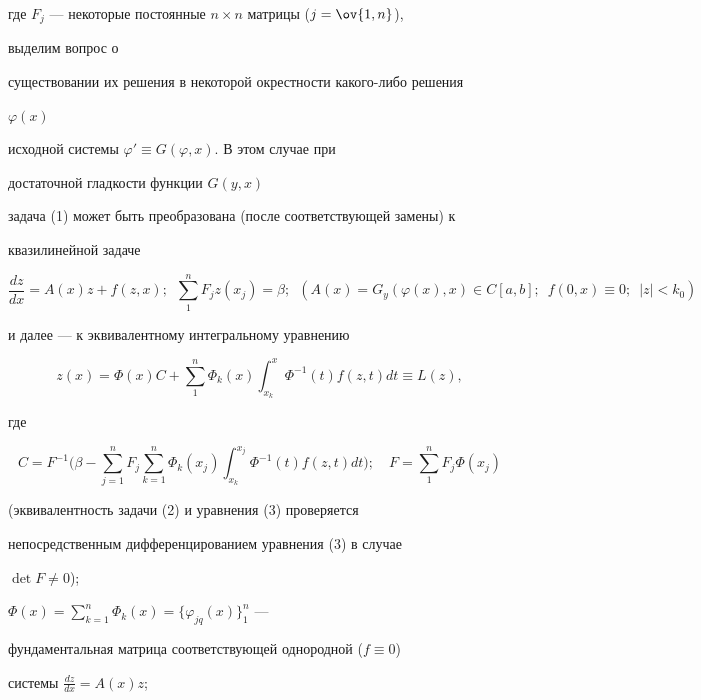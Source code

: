 где $F_j$ --- некоторые постоянные $n\times n$ матрицы ($j=\ov{1,n}$), 


выделим вопрос о 


существовании их решения в некоторой окрестности какого-либо решения 


$\varphi(x)$ 


исходной системы $\varphi'\equiv G(\varphi,x)$. В этом случае при 


достаточной гладкости функции $G(y,x)$ 


задача (1) может быть преобразована (после соответствующей замены) к 


квазилинейной задаче 


\begin{equation} 


\frac{dz}{dx}=A(x)z\!+\!f(z,x);\ \; \sum^n_1 F_j z(x_j)\!=\!\beta;\ \;


(A(x)=G_y(\varphi(x),x)\!\in\! C[a,b];\ \; f(0,x)\equiv 0; 


\ \; |z|<k_0) 


\end{equation} 


и далее --- к эквивалентному интегральному уравнению \cite{5} 


\begin{equation} 


z(x)=\Phi(x)C+\sum^n_1\Phi_k(x)\int^x_{x_k}\Phi^{-1}(t) 


f(z,t)dt\equiv L(z), 


\end{equation} 


где 


$$ 


C=F^{-1}\bigg(\beta-\sum^n_{j=1}F_j \sum^n_{k=1} 


\Phi_k(x_j)\int^{x_j}_{x_k}\Phi^{-1}(t)f(z,t)dt\bigg);\quad 


F=\sum^n_1 F_j\Phi(x_j) 


$$ 


(эквивалентность задачи (2) и уравнения (3) проверяется \cite{5} 


непосредственным дифференцированием уравнения (3) в случае 


$\det F\ne 0$); 


$\Phi(x)=\sum\limits^n_{k=1}\Phi_k(x)=\{\varphi_{jq}(x)\}^n_1$ --- 


фундаментальная матрица соответствующей однородной ($f\equiv 0$) 


системы $\frac{dz}{dx}=A(x)z$; 


